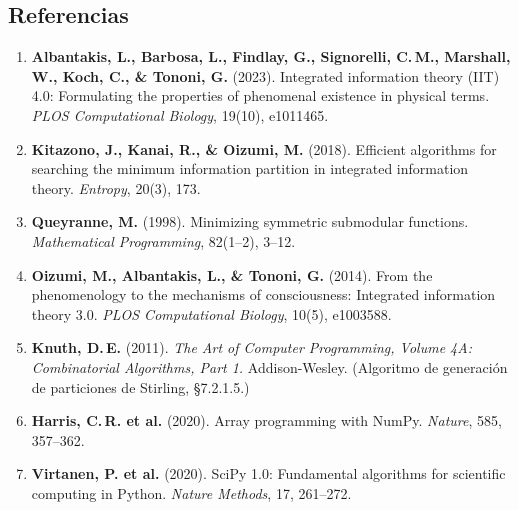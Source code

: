 \subsection{Referencias}

\begin{enumerate}
  \item \textbf{Albantakis, L., Barbosa, L., Findlay, G., Signorelli, C.\,M.,
        Marshall, W., Koch, C., \& Tononi, G.} (2023).
        Integrated information theory (IIT) 4.0: Formulating the properties
        of phenomenal existence in physical terms.
        \textit{PLOS Computational Biology}, 19(10), e1011465.

  \item \textbf{Kitazono, J., Kanai, R., \& Oizumi, M.} (2018).
        Efficient algorithms for searching the minimum information partition
        in integrated information theory.
        \textit{Entropy}, 20(3), 173.

  \item \textbf{Queyranne, M.} (1998).
        Minimizing symmetric submodular functions.
        \textit{Mathematical Programming}, 82(1--2), 3--12.

  \item \textbf{Oizumi, M., Albantakis, L., \& Tononi, G.} (2014).
        From the phenomenology to the mechanisms of consciousness:
        Integrated information theory 3.0.
        \textit{PLOS Computational Biology}, 10(5), e1003588.

  \item \textbf{Knuth, D.\,E.} (2011).
        \textit{The Art of Computer Programming, Volume 4A: Combinatorial
        Algorithms, Part 1.} Addison-Wesley.
        (Algoritmo de generación de particiones de Stirling, §7.2.1.5.)

  \item \textbf{Harris, C.\,R. et al.} (2020).
        Array programming with NumPy.
        \textit{Nature}, 585, 357--362.

  \item \textbf{Virtanen, P. et al.} (2020).
        SciPy 1.0: Fundamental algorithms for scientific computing in Python.
        \textit{Nature Methods}, 17, 261--272.
\end{enumerate}
